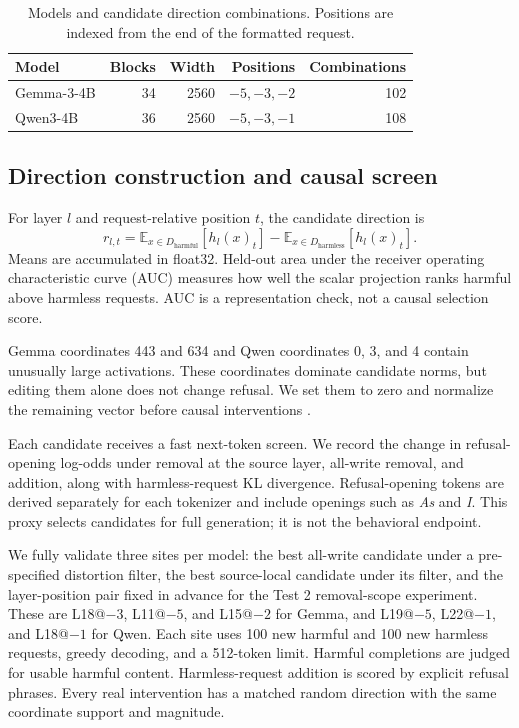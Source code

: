 \documentclass{article}
\begin{document}
\begin{table}[h]
  \centering
  \caption{Models and candidate direction combinations. Positions are indexed from the end of the formatted request.}
  \label{tab:models}
  \small
  \begin{tabular}{lrrrr}
    \toprule
    Model & Blocks & Width & Positions & Combinations \\
    \midrule
    Gemma-3-4B & 34 & 2560 & $-5,-3,-2$ & 102 \\
    Qwen3-4B & 36 & 2560 & $-5,-3,-1$ & 108 \\
    \bottomrule
  \end{tabular}
\end{table}

\subsection{Direction construction and causal screen}
\label{app:direction-construction}

For layer $l$ and request-relative position $t$, the candidate direction is
\begin{equation}
  r_{l,t} = \mathbb{E}_{x \in D_{\mathrm{harmful}}}[h_l(x)_t]
  - \mathbb{E}_{x \in D_{\mathrm{harmless}}}[h_l(x)_t].
\end{equation}
Means are accumulated in float32. Held-out area under the receiver operating characteristic curve (AUC) measures how well the scalar projection ranks harmful above harmless requests. AUC is a representation check, not a causal selection score.

Gemma coordinates 443 and 634 and Qwen coordinates 0, 3, and 4 contain unusually large activations. These coordinates dominate candidate norms, but editing them alone does not change refusal. We set them to zero and normalize the remaining vector before causal interventions \citep{sun2024massive}.

Each candidate receives a fast next-token screen. We record the change in refusal-opening log-odds under removal at the source layer, all-write removal, and addition, along with harmless-request KL divergence. Refusal-opening tokens are derived separately for each tokenizer and include openings such as \textit{As} and \textit{I}. This proxy selects candidates for full generation; it is not the behavioral endpoint.

We fully validate three sites per model: the best all-write candidate under a pre-specified distortion filter, the best source-local candidate under its filter, and the layer-position pair fixed in advance for the Test 2 removal-scope experiment. These are L18@$-3$, L11@$-5$, and L15@$-2$ for Gemma, and L19@$-5$, L22@$-1$, and L18@$-1$ for Qwen. Each site uses 100 new harmful and 100 new harmless requests, greedy decoding, and a 512-token limit. Harmful completions are judged for usable harmful content. Harmless-request addition is scored by explicit refusal phrases. Every real intervention has a matched random direction with the same coordinate support and magnitude.
\end{document}

